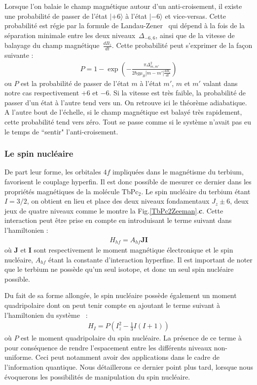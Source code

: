 Lorsque l'on balaie le champ magnétique autour d'un anti-croisement, il existe une probabilité de passer de l'état $|+6\rangle$ à l'état $|-6\rangle$ et vice-versas. Cette probabilité est régie par la formule de Landau-Zener~\cite{Zener1932} qui dépend à la fois de la séparation minimale entre les deux niveaux~$\Delta_{-6,6}$, ainsi que de la vitesse de balayage du champ magnétique~$\frac{dB_z}{dt}$. Cette probabilité peut s'exprimer de la façon suivante :
\begin{eqnarray}
P = 1 - \exp \left( -\frac{\pi \Delta^2_{m,m'}}{2 \hbar g \mu_B |m-m'|\frac{dB_z}{dt}} \right)
\end{eqnarray}
ou $P$ est la probabilité de passer de l'état $m$ à l'état $m'$, $m$ et $m'$ valant dans notre cas respectivement $+6$ et $-6$. Si la vitesse est très faible, la probabilité de passer d'un état à l'autre tend vers un. On retrouve ici le théorème adiabatique. A l'autre bout de l'échelle, si le champ magnétique est balayé très rapidement, cette probabilité tend vers zéro. Tout se passe comme si le système n'avait pas eu le temps de ``sentir" l'anti-croisement.




\subsubsection{Le spin nucléaire}
De part leur forme, les orbitales $4f$ impliquées dans le magnétisme du terbium, favorisent le couplage hyperfin. Il est donc possible de mesurer ce dernier dans les propriétés magnétiques de la molécule TbPc$_{2}$. Le spin nucléaire du terbium étant $I = 3/2$, on obtient en lieu et place des deux niveaux fondamentaux $J_z \pm 6$, deux jeux de quatre niveaux comme le montre la Fig.\ref{TbPc2Zeeman}.\textbf{c}. Cette interaction peut être prise en compte en introduisant le terme suivant dans l'hamiltonien :
\begin{eqnarray}
H_{hf} = A_{hf}\mathbf{J}\mathbf{I}
\end{eqnarray}
où $\mathbf{J}$ et $\mathbf{I}$ sont respectivement le moment magnétique électronique et le spin nucléaire, $A_{hf}$ étant la constante d'interaction hyperfine. Il est important de noter que le terbium ne possède qu'un seul isotope, et donc un seul spin nucléaire possible.

Du fait de sa forme allongée, le spin nucléaire possède également un moment quadripolaire dont on peut tenir compte en ajoutant le terme suivant à l'hamiltonien du système~\cite{Bleaney1961} :
\begin{eqnarray}
H_I = P\left(I_z^2 - \frac{1}{3}I(I+1)\right)
\end{eqnarray}
où $P$ est le moment quadripolaire du spin nucléaire. La présence de ce terme à pour conséquence de rendre l'espacement entre les différents niveaux non-uniforme. Ceci peut notamment avoir des applications dans le cadre de l'information quantique. Nous détaillerons ce dernier point plus tard, lorsque nous évoquerons les possibilités de manipulation du spin nucléaire.


